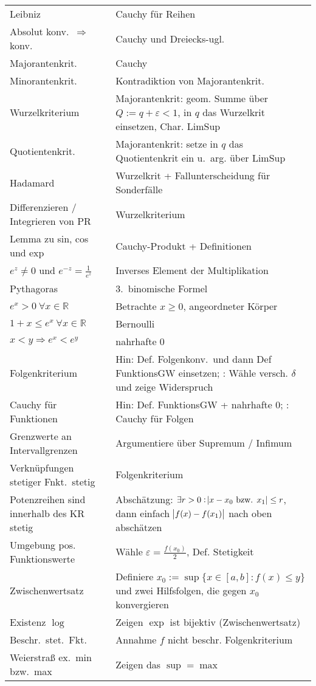 \documentclass[10pt]{report}
\newcommand{\R}{\mathbb{R}}
\begin{document}
\begin{center}
\begin{longtable}{lp{6cm}}
                Leibniz & Cauchy für Reihen \\
                Absolut konv.\ $\Rightarrow$  konv. & Cauchy und Dreiecks-ugl.\\
                Majorantenkrit. & Cauchy\\
                Minorantenkrit. & Kontradiktion von Majorantenkrit.\\
                Wurzelkriterium & Majorantenkrit: geom. Summe über $Q:=q+\varepsilon<1$, in $q$ das Wurzelkrit einsetzen, Char. LimSup\\
                Quotientenkrit. & Majorantenkrit: setze in $q$ das Quotientenkrit ein u.\ arg. über LimSup \\
                Hadamard & Wurzelkrit + Fallunterscheidung für Sonderfälle\\
                Differenzieren / Integrieren von PR & Wurzelkriterium\\
                Lemma zu sin, cos und exp & Cauchy-Produkt + Definitionen\\
                $e^z \neq 0$ und $e^{-z} = \frac{1}{e^{z}}$ & Inverses Element der Multiplikation\\
                Pythagoras & 3.\ binomische Formel\\
                $e^x > 0\ \forall x \in \R$ & Betrachte $x \geq 0$, angeordneter Körper\\
                $1+x \leq e^x\ \forall x \in \R$ & Bernoulli\\
                $x<y \Rightarrow e^x < e^y$ & nahrhafte 0\\
                Folgenkriterium & Hin: Def. Folgenkonv.\ und dann Def FunktionsGW einsetzen; : Wähle versch. $\delta$ und zeige Widerspruch\\
                Cauchy für Funktionen & Hin: Def. FunktionsGW + nahrhafte 0; : Cauchy für Folgen\\
                Grenzwerte an Intervallgrenzen & Argumentiere über Supremum / Infimum\\
                Verknüpfungen stetiger Fnkt.\ stetig & Folgenkriterium\\
                Potenzreihen sind innerhalb des KR stetig & Abschätzung: $\exists r>0 : \abs{x-x_0 \text{ bzw. } x_1} \leq r$, dann einfach $\abs{f(x)-f(x_1)}$ nach oben abschätzen\\
                Umgebung pos. Funktionswerte & Wähle $\varepsilon = \frac{f(x_0)}{2}$, Def. Stetigkeit\\
                Zwischenwertsatz & Definiere $x_0 := \sup \{x \in [a,b] : f(x) \leq y \}$ und zwei Hilfsfolgen, die gegen $x_0$ konvergieren\\
                Existenz $\log$ & Zeigen $\exp$ ist bijektiv (Zwischenwertsatz)\\
                Beschr.\ stet.\ Fkt.\ & Annahme $f$ nicht beschr. Folgenkriterium\\
                Weierstraß ex.\ min bzw.\ max & Zeigen das $\sup=\max$\\
            \bottomrule
        \end{longtable}
    \end{center}
\end{document}
